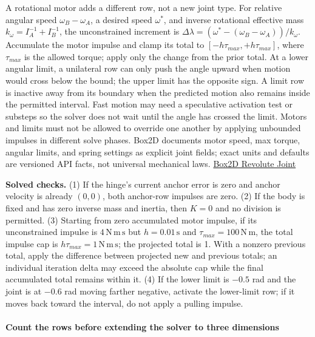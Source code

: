 A rotational motor adds a different row, not a new joint type. For relative angular speed \(\omega_B-\omega_A\), a desired speed \(\omega^*\), and inverse rotational effective mass \(k_\omega=I_A^{-1}+I_B^{-1}\), the unconstrained increment is \(\Delta\lambda=(\omega^*-(\omega_B-\omega_A))/k_\omega\). Accumulate the motor impulse and clamp its total to \([-h\tau_{max},+h\tau_{max}]\), where \(\tau_{max}\) is the allowed torque; apply only the change from the prior total. At a lower angular limit, a unilateral row can only push the angle upward when motion would cross below the bound; the upper limit has the opposite sign. A limit row is inactive away from its boundary when the predicted motion also remains inside the permitted interval. Fast motion may need a speculative activation test or substeps so the solver does not wait until the angle has crossed the limit. Motors and limits must not be allowed to override one another by applying unbounded impulses in different solve phases. Box2D documents motor speed, max torque, angular limits, and spring settings as explicit joint fields; exact units and defaults are versioned API facts, not universal mechanical laws. \href{https://box2d.org/documentation/group__revolute__joint.html}{Box2D Revolute Joint}

\textbf{Solved checks.} (1) If the hinge's current anchor error is zero and anchor velocity is already \((0,0)\), both anchor-row impulses are zero. (2) If the body is fixed and has zero inverse mass and inertia, then \(K=0\) and no division is permitted. (3) Starting from zero accumulated motor impulse, if its unconstrained impulse is \(4\,\mathrm{N\,m\,s}\) but \(h=0.01\,\mathrm s\) and \(\tau_{max}=100\,\mathrm{N\,m}\), the total impulse cap is \(h\tau_{max}=1\,\mathrm{N\,m\,s}\); the projected total is 1. With a nonzero previous total, apply the difference between projected new and previous totals; an individual iteration delta may exceed the absolute cap while the final accumulated total remains within it. (4) If the lower limit is \(-0.5\) rad and the joint is at \(-0.6\) rad moving farther negative, activate the lower-limit row; if it moves back toward the interval, do not apply a pulling impulse.

\paragraph{Count the rows before extending the solver to three dimensions}\label{count-the-rows-before-extending-the-solver-to-three-dimensions}

